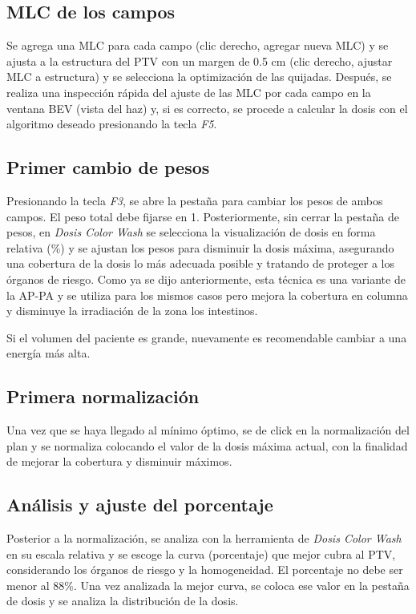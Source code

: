 \documentclass{article}
\begin{document}
\subsection{MLC de los campos}

Se agrega una MLC para cada campo (clic derecho, agregar nueva MLC) y se ajusta a la estructura del PTV con un margen de 0.5 cm (clic derecho, ajustar MLC a estructura) y se selecciona la optimización de las quijadas. Después, se realiza una inspección rápida del ajuste de las MLC por cada campo en la ventana BEV (vista del haz) y, si es correcto, se procede a calcular la dosis con el algoritmo deseado presionando la tecla \textit{F5}.

\subsection{Primer cambio de pesos}

Presionando la tecla \textit{F3}, se abre la pestaña para cambiar los pesos de ambos campos. El peso total debe fijarse en 1. Posteriormente, sin cerrar la pestaña de pesos, en \textit{Dosis Color Wash} se selecciona la visualización de dosis en forma relativa (\%) y se ajustan los pesos para disminuir la dosis máxima, asegurando una cobertura de la dosis lo más adecuada posible y tratando de proteger a los órganos de riesgo. Como ya se dijo anteriormente, esta técnica es una variante de la AP-PA y se utiliza para los mismos casos pero mejora la cobertura en columna y disminuye la irradiación de la zona los intestinos.

Si el volumen del paciente es grande, nuevamente es recomendable cambiar a una energía más alta.

\subsection{Primera normalización}

Una vez que se haya llegado al mínimo óptimo, se de click en la normalización del plan y se normaliza colocando el valor de la dosis máxima actual, con la finalidad de mejorar la cobertura y disminuir máximos.

\subsection{Análisis y ajuste del porcentaje}

Posterior a la normalización, se analiza con la herramienta de \textit{Dosis Color Wash} en su escala relativa y se escoge la curva (porcentaje) que mejor cubra al PTV, considerando los órganos de riesgo y la homogeneidad. El porcentaje no debe ser menor al 88\%. Una vez analizada la mejor curva, se coloca ese valor en la pestaña de dosis y se analiza la distribución de la dosis.
\end{document}
